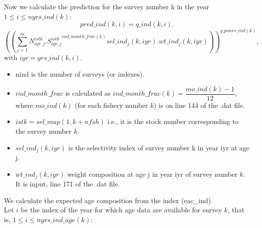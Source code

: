 \documentclass{article}
\begin{document}
Now we calculate the prediction for the survey number k in the year $1\leq i \leq nyrs\_ind(k)$:
\begin{equation}
    pred\_ind(k,i)=q\_ind(k,i).
\end{equation}
\begin{equation}
    \left(\left(\sum_{j=1}^mN^{istk}_{iyr,j}.{S^{istk}_{iyr,j}}^{ind\_month\_frac(k)}sel\_ind_j(k,iyr).wt\_ind_j(k,iyr)\right)\right)^{q\_power\_ind(k)},
\end{equation}
with $iyr=yrs\_ind(k,i)$.
\begin{itemize}
\item nind is the number of surveys (or indexes).

    \item $ind\_month\_frac$ is calculated as $ind\_month\_frac(k)=\dfrac{mo\_ind(k)-1}{12}$, where $mo\_ind(k)$ (for each fishery number $k$) is on line 144 of the .dat file.
    \item $istk=sel\_map(1,k+nfsh)$ 
i.e., it is the stock number corresponding to the survey number $k$.
    \item $sel\_ind_j(k,iyr)$ 
is the selectivity index of survey number k in year iyr at age j.
    \item $wt\_ind_j(k,iyr)$ 
weight composition at age j in year iyr of survey number $k$. It is input, line 171 of the .dat file.
    \end{itemize}
We calculate the expected age composition from the index (eac\_ind).\\
Let $i$ be the index of the year for which age data are available for survey $k$, that is, $1\leq i \leq nyrs\_ind\_age(k)$:
\end{document}
